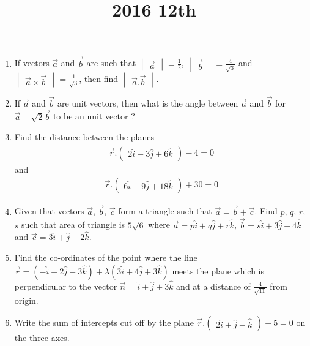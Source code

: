 \documentclass[12pt,-letter paper]{article}
\title{2016 12th}
\newcommand{\myvec}[1]{\ensuremath{\begin{pmatrix}#1\end{pmatrix}}}
\newcommand{\mydet}[1]{\ensuremath{\begin{vmatrix}#1\end{vmatrix}}}
\begin{document}

\begin{enumerate}

\section{Vectors}
	\item If vectors $\overrightarrow{a}$ and $\overrightarrow{b}$ are such that
 $\mydet{\overrightarrow{a}} = \frac{1}{2}$, $\mydet{\overrightarrow{b}} = \frac{4}{\sqrt{3}}$
 and $\mydet{\overrightarrow{a} \times \overrightarrow{b}} = \frac{1}{\sqrt{3}}$, then find 
 $\mydet{\overrightarrow{a}.\overrightarrow{b}}$.

	\item If $\overrightarrow{a}$ and $\overrightarrow{b}$ are unit vectors, then what is the angle between 
$\overrightarrow{a}$ and $\overrightarrow{b}$ for $\overrightarrow{a} - \sqrt{2}\overrightarrow{b}$ to be an unit vector ?
	
	\item Find the distance between the planes 
		\begin{align}
			\overrightarrow{r}.\myvec{2\hat{i}-3\hat{j}+6\hat{k} } - 4 =0
		\end{align}
	and 
		\begin{align}
			\overrightarrow{r}.\myvec{6\hat{i}-9\hat{j} +18\hat{k}} +30 =0
		\end{align}

	\item Given that vectors $\overrightarrow{a}$, $\overrightarrow{b}$, $\overrightarrow{c}$ form a triangle such that 
$\overrightarrow{a} = \overrightarrow{b}+\overrightarrow{c}$. Find $p$, $q$, $r$, $s$ such that area of triangle is $5\sqrt{6}$ where $\overrightarrow{a} = p\hat{i} +q\hat{j}+r\hat{k}$, 
$\overrightarrow{b} = s\hat{i} +3\hat{j}+4\hat{k}$ and $\overrightarrow{c}=3\hat{i} +\hat{j}-2\hat{k}$.
	
	\item Find the co-ordinates of the point where the line $\overrightarrow{r}=(-\hat{i}-2\hat{j}-3\hat{k})+\lambda(3\hat{i} +4\hat{j}+3\hat{k})$ meets the plane which is perpendicular to the vector $\overrightarrow{n}=\hat{i}+\hat{j} +3\hat{k}$ and at a distance of
$\frac{4}{\sqrt{11}}$ from origin.

	
	\item Write the sum of intercepts cut off by the plane $\overrightarrow{r}.\myvec{2\hat{i}+\hat{j}-\hat{k}} - 5 = 0$ on the three axes.


\end{enumerate}
\end{document}
